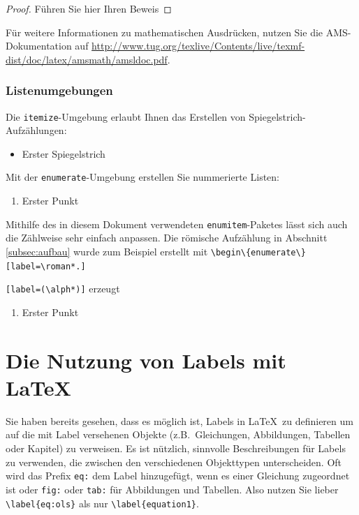 \documentclass[a4paper,12pt]{scrartcl} %
\begin{document}
\begin{proof}
Führen Sie hier Ihren Beweis
\end{proof}

Für weitere Informationen zu mathematischen Ausdrücken, nutzen Sie die AMS-Dokumentation auf \url{http://www.tug.org/texlive/Contents/live/texmf-dist/doc/latex/amsmath/amsldoc.pdf}.

\subsubsection*{Listenumgebungen}

Die \texttt{itemize}-Umgebung erlaubt Ihnen das Erstellen von Spiegelstrich-Aufzählungen:

\begin{itemize}
  \item Erster Spiegelstrich
\end{itemize}
Mit der \texttt{enumerate}-Umgebung erstellen Sie nummerierte Listen:
\begin{enumerate}
  \item Erster Punkt
\end{enumerate}

Mithilfe des in diesem Dokument verwendeten \texttt{enumitem}-Paketes lässt sich auch die Zählweise sehr einfach anpassen. Die römische Aufzählung in Abschnitt \ref{subsec:aufbau} wurde zum Beispiel erstellt mit
\verb|\begin\{enumerate\}[label=\roman*.]|

\verb|[label=(\alph*)]| erzeugt
\begin{enumerate}[label=(\alph*)]
  \item Erster Punkt
\end{enumerate}



\section{Die Nutzung von Labels mit \LaTeX}

Sie haben bereits gesehen, dass es möglich ist, Labels in \LaTeX\ zu definieren um auf die mit Label versehenen Objekte (z.B.\ Gleichungen, Abbildungen, Tabellen oder Kapitel) zu verweisen. Es ist nützlich, sinnvolle Beschreibungen für Labels zu verwenden, die zwischen den verschiedenen Objekttypen unterscheiden. Oft wird das Prefix \texttt{eq:} dem Label hinzugefügt, wenn es einer Gleichung zugeordnet ist oder \texttt{fig:} oder \texttt{tab:} für Abbildungen und Tabellen. Also nutzen Sie lieber \verb|\label{eq:ols}| als nur \verb|\label{equation1}|.
\end{document}
